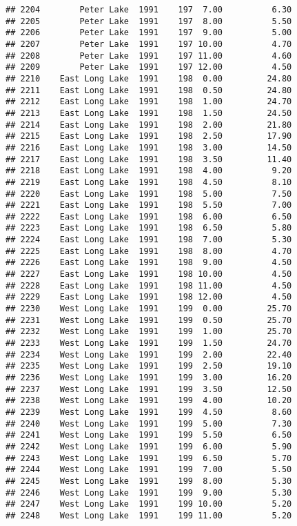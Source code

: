 \documentclass[
]{article}
\begin{document}
\begin{verbatim}
## 2204        Peter Lake  1991    197  7.00          6.30
## 2205        Peter Lake  1991    197  8.00          5.50
## 2206        Peter Lake  1991    197  9.00          5.00
## 2207        Peter Lake  1991    197 10.00          4.70
## 2208        Peter Lake  1991    197 11.00          4.60
## 2209        Peter Lake  1991    197 12.00          4.50
## 2210    East Long Lake  1991    198  0.00         24.80
## 2211    East Long Lake  1991    198  0.50         24.80
## 2212    East Long Lake  1991    198  1.00         24.70
## 2213    East Long Lake  1991    198  1.50         24.50
## 2214    East Long Lake  1991    198  2.00         21.80
## 2215    East Long Lake  1991    198  2.50         17.90
## 2216    East Long Lake  1991    198  3.00         14.50
## 2217    East Long Lake  1991    198  3.50         11.40
## 2218    East Long Lake  1991    198  4.00          9.20
## 2219    East Long Lake  1991    198  4.50          8.10
## 2220    East Long Lake  1991    198  5.00          7.50
## 2221    East Long Lake  1991    198  5.50          7.00
## 2222    East Long Lake  1991    198  6.00          6.50
## 2223    East Long Lake  1991    198  6.50          5.80
## 2224    East Long Lake  1991    198  7.00          5.30
## 2225    East Long Lake  1991    198  8.00          4.70
## 2226    East Long Lake  1991    198  9.00          4.50
## 2227    East Long Lake  1991    198 10.00          4.50
## 2228    East Long Lake  1991    198 11.00          4.50
## 2229    East Long Lake  1991    198 12.00          4.50
## 2230    West Long Lake  1991    199  0.00         25.70
## 2231    West Long Lake  1991    199  0.50         25.70
## 2232    West Long Lake  1991    199  1.00         25.70
## 2233    West Long Lake  1991    199  1.50         24.70
## 2234    West Long Lake  1991    199  2.00         22.40
## 2235    West Long Lake  1991    199  2.50         19.10
## 2236    West Long Lake  1991    199  3.00         16.20
## 2237    West Long Lake  1991    199  3.50         12.50
## 2238    West Long Lake  1991    199  4.00         10.20
## 2239    West Long Lake  1991    199  4.50          8.60
## 2240    West Long Lake  1991    199  5.00          7.30
## 2241    West Long Lake  1991    199  5.50          6.50
## 2242    West Long Lake  1991    199  6.00          5.90
## 2243    West Long Lake  1991    199  6.50          5.70
## 2244    West Long Lake  1991    199  7.00          5.50
## 2245    West Long Lake  1991    199  8.00          5.30
## 2246    West Long Lake  1991    199  9.00          5.30
## 2247    West Long Lake  1991    199 10.00          5.20
## 2248    West Long Lake  1991    199 11.00          5.20

\end{verbatim}
\end{document}
